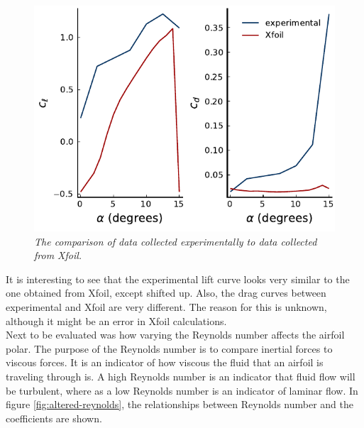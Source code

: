 \documentclass{journal}
\begin{document}
	\begin{figure}[H]
		\centering
		\includegraphics{../graphics/airfoil-compare.pdf}
		\caption{\emph{The comparison of data collected experimentally to data collected from Xfoil.}}
		\label{fig:airfoil-comparison}
	\end{figure}
	
	It is interesting to see that the experimental lift curve looks very similar to the one obtained from Xfoil, except shifted up. Also, the drag curves between experimental and Xfoil are very different. The reason for this is unknown, although it might be an error in Xfoil calculations.\\
	
	Next to be evaluated was how varying the Reynolds number affects the airfoil polar. The purpose of the Reynolds number is to compare inertial forces to viscous forces. It is an indicator of how viscous the fluid that an airfoil is traveling through is. A high Reynolds number is an indicator that fluid flow will be turbulent, where as a low Reynolds number is an indicator of laminar flow. In figure \ref{fig:altered-reynolds}, the relationships between Reynolds number and the coefficients are shown.\\
	
\end{document}
